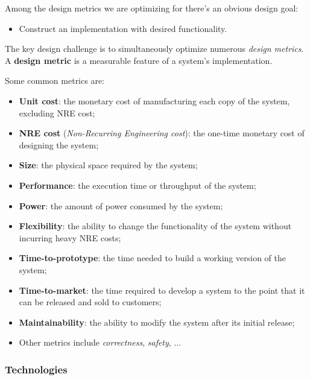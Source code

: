 \documentclass[a4paper,11pt]{article}
\begin{document}
Among the design metrics we are optimizing for there's an obvious design goal:
\begin{itemize}
	\item Construct an implementation with desired functionality.
\end{itemize}
The key design challenge is to simultaneously optimize numerous \textit{design metrics}.
A \textbf{design metric} is a measurable feature of a system’s implementation.

Some common metrics are:
\begin{itemize}
	\item \textbf{Unit cost}: the monetary cost of manufacturing each copy of the system, excluding NRE cost;
	\item \textbf{NRE cost} (\textit{Non-Recurring Engineering cost}): the one-time monetary cost of designing the system;
	\item \textbf{Size}: the physical space required by the system;
	\item \textbf{Performance}: the execution time or throughput of the system;
	\item \textbf{Power}: the amount of power consumed by the system;
	\item \textbf{Flexibility}: the ability to change the functionality of the system without incurring heavy NRE costs;
	\item \textbf{Time-to-prototype}: the time needed to build a working version of the system;
	\item \textbf{Time-to-market}: the time required to develop a system to the point that it can be released and sold to customers;
	\item \textbf{Maintainability}: the ability to modify the system after its initial release;
	\item Other metrics include \textit{correctness}, \textit{safety}, ...
\end{itemize}

\subsubsection{Technologies}
\end{document}
